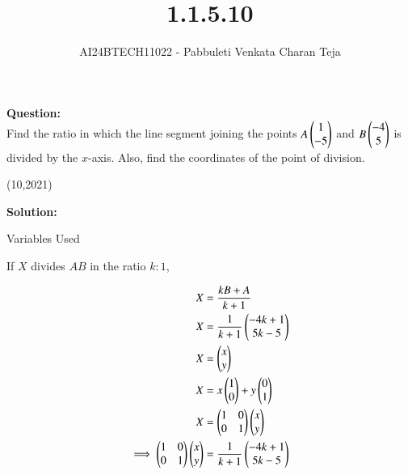 \documentclass[journal]{IEEEtran}
\begin{document}

\vspace{3cm}

\title{1.1.5.10}
\author{AI24BTECH11022 - Pabbuleti Venkata Charan Teja}
\maketitle

\renewcommand{\thefigure}{\theenumi}
\renewcommand{\thetable}{\theenumi}

\textbf{Question:}\\
Find the ratio in which the line segment joining the points $A\begin{pmatrix}1 \\ -5\\\end{pmatrix}$ and $B\begin{pmatrix}-4\\5\\\end{pmatrix}$ is divided by the $x$-axis. Also, find the coordinates of the point of division.

\hfill{(10,2021)}

\textbf{Solution:}

\begin{table}[h!]
\renewcommand{\thetable}{1}
    \centering
   
   \def\tablename{Table}
   \caption{Variables Used}
    \label{tab1.1.5.10.1}
\end{table}
If $X$ divides $AB$ in the ratio $k:1$,

\begin{align}
X&=\frac{kB+A}{k+1} \label{eq1.1.5.10.1} \\
X&=\frac{1}{k+1}
\begin{pmatrix}
-4k+1 \\
5k-5 \\
\end{pmatrix} \label{eq1.1.5.10.2} \\
X&=
\begin{pmatrix}
x \\
y \\
\end{pmatrix} \\
X&=x\begin{pmatrix}1 \\ 0 \\\end{pmatrix}+y\begin{pmatrix}0 \\ 1 \\\end{pmatrix} \label{eq1.1.5.10.3}\\
X&=
\begin{pmatrix}
1 & 0 \\
0 & 1 \\
\end{pmatrix}
\begin{pmatrix}
x \\
y \\
\end{pmatrix}\label{eq1.1.5.10.4} \\
\implies
\begin{pmatrix}
1 & 0 \\
0 & 1 \\
\end{pmatrix}
\begin{pmatrix}
x \\
y \\
\end{pmatrix}
&=\frac{1}{k+1}
\begin{pmatrix}
-4k+1 \\
5k-5 \\
\end{pmatrix} \label{eq1.1.5.10.5}
\end{align}
\end{document}
